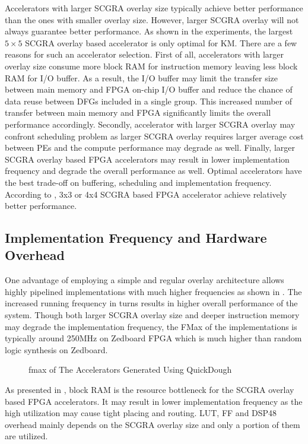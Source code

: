 Accelerators with larger SCGRA overlay size typically achieve better performance than the ones with smaller overlay size. However, larger SCGRA overlay will not always guarantee better performance. As shown in the experiments, the largest $5 \times 5$ SCGRA overlay based accelerator is only optimal for KM. There are a few reasons for such an accelerator selection. First of all, accelerators with larger overlay size consume 
more block RAM for instruction memory leaving less block RAM for I/O buffer. As a result, the I/O
buffer may limit the transfer size between main memory and FPGA on-chip I/O buffer and reduce the
chance of data reuse between DFGs included in a single group. This increased number of transfer
between main memory and FPGA significantly limits the overall performance accordingly. Secondly, 
accelerator with larger SCGRA overlay may confront scheduling problem as larger SCGRA
overlay requires larger average cost between PEs and the compute performance may degrade as well.
Finally, larger SCGRA overlay based FPGA accelerators may result in lower implementation frequency
and degrade the overall performance as well. Optimal accelerators have the best trade-off on
buffering, scheduling and implementation frequency. According to , 3x3 or 4x4
SCGRA based FPGA accelerator achieve relatively better performance.

\subsection{Implementation Frequency and Hardware Overhead} \label{subsec:acc-impl}
One advantage of employing a simple and regular overlay architecture allows highly 
pipelined implementations with much higher frequencies as shown in . 
The increased running frequency in turns results in higher overall 
performance of the system. Though both larger SCGRA overlay size 
and deeper instruction memory may degrade the implementation frequency, the FMax of the
implementations is typically around 250MHz on Zedboard FPGA which is much higher than random logic
synthesis on Zedboard.

\begin{figure}[htb]
\caption{fmax of The Accelerators Generated Using QuickDough}
\label{fig:impl-freq}
\end{figure}

As presented in , block RAM is the resource bottleneck for the SCGRA overlay
based FPGA accelerators. It may result in lower implementation frequency as the high utilization may
cause tight placing and routing. LUT, FF and DSP48 overhead mainly depends on the SCGRA overlay size and only a
portion of them are utilized.


